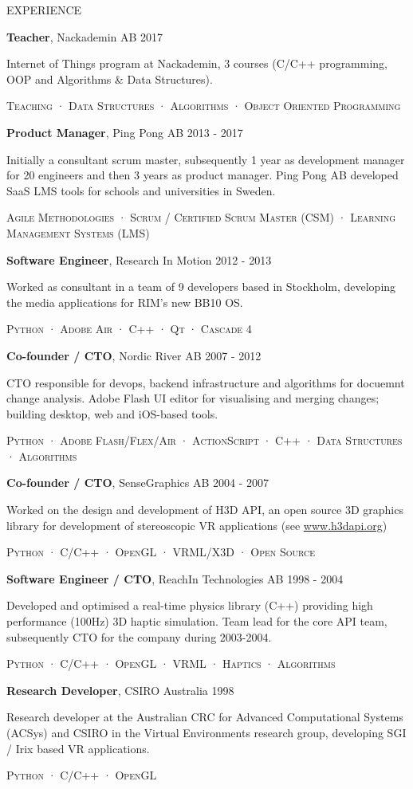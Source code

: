 \documentclass{resume} %
\newcommand{\PRLsep}{\noindent\makebox[\linewidth]{\resizebox{0.1\linewidth}{0.25pt}{$\bullet$}}}
\newcommand{\rExperience}[5]{
  \textbf{#1}, #2 \hfill #3

  #4
  
  \begin{center} \textsc{\scriptsize #5 } \end{center}
}
\begin{document}
\begin{rSection}{EXPERIENCE}
  \PRLsep

  {\rExperience
    {Teacher} {Nackademin AB} {2017}
    {Internet of Things program at Nackademin, 3 courses (C/C++ programming, OOP and Algorithms \& Data Structures).}
    {Teaching · Data Structures · Algorithms · Object Oriented Programming}
  }

  \PRLsep

  {\rExperience
    {Product Manager} {Ping Pong AB} {2013 - 2017}
    {Initially a consultant scrum master, subsequently 1 year as development manager for 20 engineers and then 3 years as product manager. Ping Pong AB developed SaaS LMS tools for schools and universities in Sweden.}
    {Agile Methodologies · Scrum / Certified Scrum Master (CSM) · Learning Management Systems (LMS)}
  }

  \PRLsep

  {\rExperience
    {Software Engineer} {Research In Motion} {2012 - 2013}
    {Worked as consultant in a team of 9 developers based in Stockholm, developing the media applications for RIM's new BB10 OS.}
    {Python · Adobe Air · C++ · Qt · Cascade 4}
  }

  \PRLsep

  {\rExperience
    {Co-founder / CTO} {Nordic River AB} {2007 - 2012}
    {CTO responsible for devops, backend infrastructure and algorithms for docuemnt change analysis. Adobe Flash UI editor for visualising and merging changes; building desktop, web and iOS-based tools.}
    {Python · Adobe Flash/Flex/Air · ActionScript · C++ · Data Structures · Algorithms}
  }

  \PRLsep

  {\rExperience
    {Co-founder / CTO} {SenseGraphics AB} {2004 - 2007}
    {Worked on the design and development of H3D API, an open source 3D graphics library for development of stereoscopic VR applications (see \href{https://web.archive.org/web/20081217063248/http://www.h3dapi.org:80/}{www.h3dapi.org})}
    {Python · C/C++ · OpenGL · VRML/X3D · Open Source}
  }

  \pagebreak
  \vspace*{1em}

  {\rExperience
    {Software Engineer / CTO} {ReachIn Technologies AB} {1998 - 2004}
    {Developed and optimised a real-time physics library (C++) providing high performance (100Hz) 3D haptic simulation. Team lead for the core API team, subsequently CTO for the company during 2003-2004.}
    {Python · C/C++ · OpenGL · VRML · Haptics · Algorithms}
  }

  \PRLsep

  {\rExperience
    {Research Developer} {CSIRO Australia} {1998}
    {Research developer at the Australian CRC for Advanced Computational Systems (ACSys) and CSIRO in the Virtual Environments research group, developing SGI / Irix based VR applications.}
    {Python · C/C++ · OpenGL}
  }


\end{rSection} 
\end{document}
